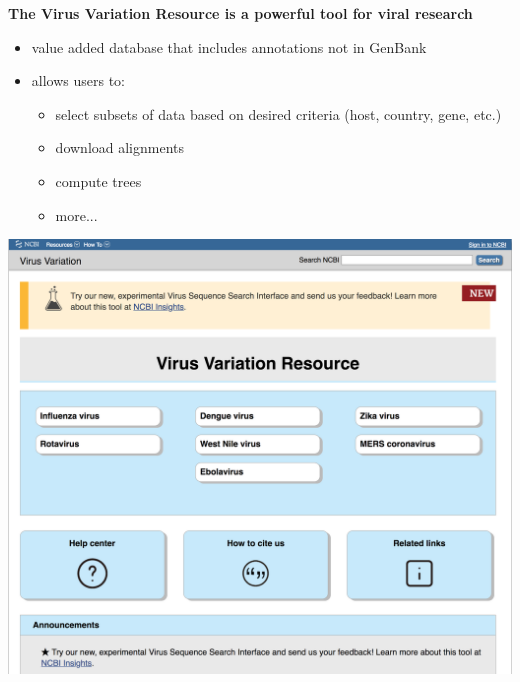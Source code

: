 \documentclass[landscape]{slides}
\begin{document}
\begin{slide}
\begin{center}
\textbf{The Virus Variation Resource is a powerful tool for viral research}

\begin{minipage}[c]{4in}
\tiny
\begin{itemize}
\item value added database that includes annotations not in GenBank
\item allows users to: 
\begin{itemize}
  \item select subsets of data based on desired criteria
    (host, country, gene, etc.)
  \item download alignments
  \item  compute trees
  \item  more...
\end{itemize}
\end{itemize}
\vfill
\end{minipage}
\begin{minipage}[c]{6in}
\includegraphics[width=6in]{figs/viv-page1}
\vfill
\end{minipage}

\vfill
\end{center}
\end{slide}
\end{document}
